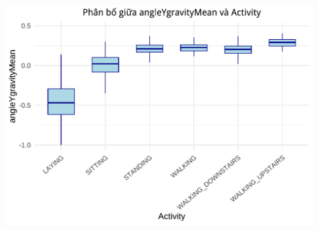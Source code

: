 \documentclass[
]{article}
\begin{document}
\includegraphics{report_files/figure-latex/unnamed-chunk-21-1.pdf}
\end{document}
